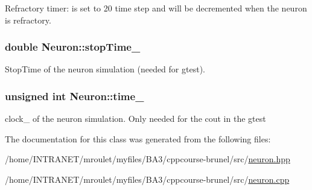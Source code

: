 Refractory timer\-: is set to 20 time step and will be decremented when the neuron is refractory. 

\hypertarget{classNeuron_aa38f38c0da520dc1cb5d374c70e974eb}{
\subsubsection[{stop\-Time\-\_\-}]{\setlength{\rightskip}{0pt plus 5cm}double Neuron\-::stop\-Time\-\_\-\hspace{0.3cm}{\ttfamily [private]}}}\label{classNeuron_aa38f38c0da520dc1cb5d374c70e974eb}


Stop\-Time of the neuron simulation (needed for gtest). 

\hypertarget{classNeuron_a03bbbd9317ed48f469e589c33bc5356a}{
\subsubsection[{time\-\_\-}]{\setlength{\rightskip}{0pt plus 5cm}unsigned int Neuron\-::time\-\_\-\hspace{0.3cm}{\ttfamily [private]}}}\label{classNeuron_a03bbbd9317ed48f469e589c33bc5356a}


clock\-\_\- of the neuron simulation. Only needed for the cout in the gtest 



The documentation for this class was generated from the following files\-:\begin{DoxyCompactItemize}
\item 
/home/\-I\-N\-T\-R\-A\-N\-E\-T/mroulet/myfiles/\-B\-A3/cppcourse-\/brunel/src/\hyperlink{neuron_8hpp}{neuron.\-hpp}\item 
/home/\-I\-N\-T\-R\-A\-N\-E\-T/mroulet/myfiles/\-B\-A3/cppcourse-\/brunel/src/\hyperlink{neuron_8cpp}{neuron.\-cpp}\end{DoxyCompactItemize}

